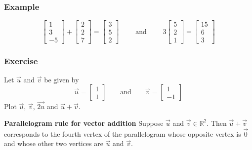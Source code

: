 \begin{frame}[fragile]\frametitle{Example}

  \[
  \left[\begin{array}{r}
   1 \\ 3 \\ -5
  \end{array}\right]
+
\left[\begin{array}{r}
   2 \\ 2 \\ 7
  \end{array}\right]
 =   
 \left[\begin{array}{r}
    3 \\ 5 \\ 2 
  \end{array}\right]   
  \qquad 
  \mbox{ and } \qquad  
   3 \left[\begin{array}{r}
   5 \\ 2 \\ 1
  \end{array}\right]
=  
\left[\begin{array}{r} 15 \\ 6 \\ 3  \end{array}\right]
\]
  
\end{frame}


\begin{frame}[fragile]\frametitle{Exercise}

Let $\vec{u}$ and $\vec{v}$ be given by 
\[
 \vec{u} = \left[\begin{array}{r} 1 \\ 1 \end{array}\right]
 \qquad \mbox{and} \qquad
 \vec{v} = \left[\begin{array}{r} 1 \\ -1 \end{array}\right]
\]
Plot  $\vec{u}$, $\vec{v}$, $\vec{2u}$ and 
$\vec{u}+\vec{v}$.


\textbf{Parallelogram rule for vector addition}
Suppose $\vec{u}$ and $\vec{v}\in \mathbb R^2$.  Then 
$\vec{u}+\vec{v}$ corresponds to the fourth vertex
of the parallelogram whose opposite vertex is $\vec{0}$
and whose other two vertices are $\vec{u}$ and $\vec{v}$.

\end{frame}

